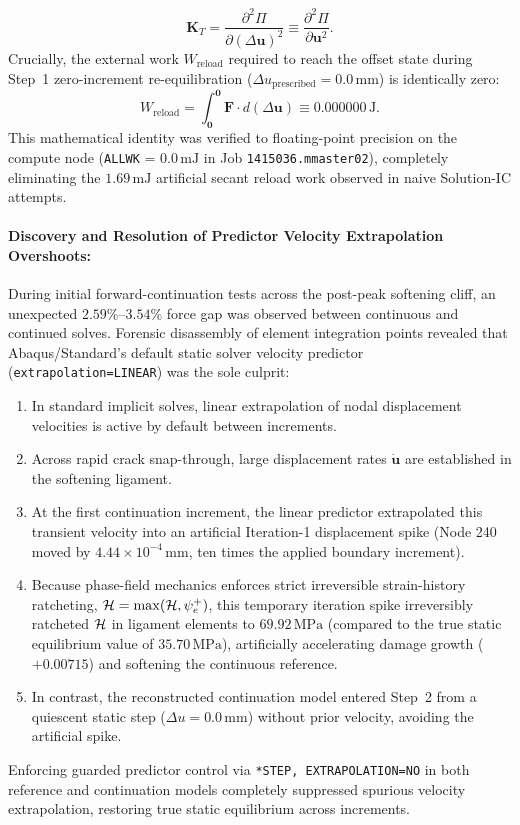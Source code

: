 \begin{equation}
  \mathbf{K}_T = \frac{\partial^2 \Pi}{\partial (\Delta\mathbf{u})^2} \equiv \frac{\partial^2 \Pi}{\partial \mathbf{u}^2}.
\end{equation}
Crucially, the external work $W_{\mathrm{reload}}$ required to reach the offset state during Step~1 zero-increment re-equilibration ($\Delta u_{\mathrm{prescribed}} = 0.0\,\mathrm{mm}$) is identically zero:
\begin{equation}
  W_{\mathrm{reload}} = \int_{\mathbf{0}}^{\mathbf{0}} \mathbf{F} \cdot d(\Delta\mathbf{u}) \equiv 0.000000\,\mathrm{J}.
\end{equation}
This mathematical identity was verified to floating-point precision on the compute node (\texttt{ALLWK} = $0.0\,\mathrm{mJ}$ in Job \texttt{1415036.mmaster02}), completely eliminating the $1.69\,\mathrm{mJ}$ artificial secant reload work observed in naive Solution-IC attempts.

\paragraph{Discovery and Resolution of Predictor Velocity Extrapolation Overshoots:}
During initial forward-continuation tests across the post-peak softening cliff, an unexpected $2.59\%$--$3.54\%$ force gap was observed between continuous and continued solves. Forensic disassembly of element integration points revealed that Abaqus/Standard's default static solver velocity predictor (\texttt{extrapolation=LINEAR}) was the sole culprit:
\begin{enumerate}
  \item In standard implicit solves, linear extrapolation of nodal displacement velocities is active by default between increments.
  \item Across rapid crack snap-through, large displacement rates $\dot{\mathbf{u}}$ are established in the softening ligament.
  \item At the first continuation increment, the linear predictor extrapolated this transient velocity into an artificial Iteration-1 displacement spike (Node 240 moved by $4.44 \times 10^{-4}\,\mathrm{mm}$, ten times the applied boundary increment).
  \item Because phase-field mechanics enforces strict irreversible strain-history ratcheting, $\mathcal{H} = \max(\mathcal{H}, \psi_e^+)$, this temporary iteration spike irreversibly ratcheted $\mathcal{H}$ in ligament elements to $69.92\,\mathrm{MPa}$ (compared to the true static equilibrium value of $35.70\,\mathrm{MPa}$), artificially accelerating damage growth ($+0.00715$) and softening the continuous reference.
  \item In contrast, the reconstructed continuation model entered Step~2 from a quiescent static step ($\Delta u = 0.0\,\mathrm{mm}$) without prior velocity, avoiding the artificial spike.
\end{enumerate}
Enforcing guarded predictor control via \texttt{*STEP, EXTRAPOLATION=NO} in both reference and continuation models completely suppressed spurious velocity extrapolation, restoring true static equilibrium across increments.

